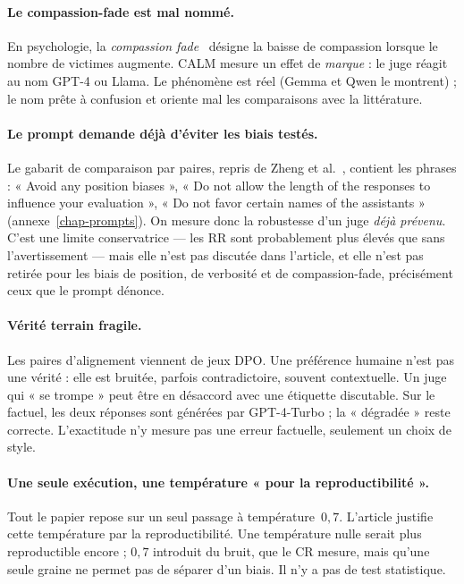 \paragraph{Le compassion-fade est mal nommé.}
En psychologie, la \emph{compassion fade}~\cite{vastfjall2014compassion} désigne la baisse de compassion lorsque le nombre de victimes augmente. CALM mesure un effet de \emph{marque} : le juge réagit au nom GPT-4 ou Llama. Le phénomène est réel (Gemma et Qwen le montrent) ; le nom prête à confusion et oriente mal les comparaisons avec la littérature.

\paragraph{Le prompt demande déjà d'éviter les biais testés.}
Le gabarit de comparaison par paires, repris de Zheng et al.\ \cite{zheng2023mtbench}, contient les phrases : « Avoid any position biases », « Do not allow the length of the responses to influence your evaluation », « Do not favor certain names of the assistants » (annexe~\ref{chap-prompts}). On mesure donc la robustesse d'un juge \emph{déjà prévenu}. C'est une limite conservatrice --- les RR sont probablement plus élevés que sans l'avertissement --- mais elle n'est pas discutée dans l'article, et elle n'est pas retirée pour les biais de position, de verbosité et de compassion-fade, précisément ceux que le prompt dénonce.

\paragraph{Vérité terrain fragile.}
Les paires d'alignement viennent de jeux DPO. Une préférence humaine n'est pas une vérité : elle est bruitée, parfois contradictoire, souvent contextuelle. Un juge qui « se trompe » peut être en désaccord avec une étiquette discutable. Sur le factuel, les deux réponses sont générées par GPT-4-Turbo ; la « dégradée » reste correcte. L'exactitude n'y mesure pas une erreur factuelle, seulement un choix de style.

\paragraph{Une seule exécution, une température « pour la reproductibilité ».}
Tout le papier repose sur un seul passage à température~$0{,}7$. L'article justifie cette température par la reproductibilité. Une température nulle serait plus reproductible encore ; $0{,}7$ introduit du bruit, que le CR mesure, mais qu'une seule graine ne permet pas de séparer d'un biais. Il n'y a pas de test statistique.

